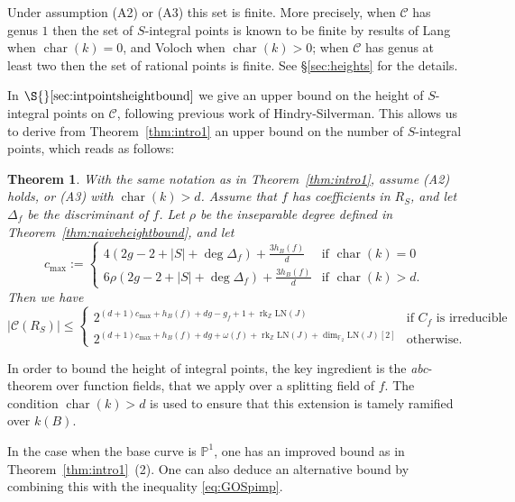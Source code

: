 \documentclass[11pt]{article}
\newcommand{\Z}{\ensuremath{\mathbb{Z}}}
\newcommand{\F}{\ensuremath{\mathbb{F}}}
\theoremstyle{plain}
\newtheorem{theorem}{Theorem}[section]
\theoremstyle{definition}
\DeclareMathOperator{\rk}{rk}
\DeclareMathOperator{\car}{char}
\newcommand{\LN}{\mathrm{LN}}
\begin{document}
Under assumption (A2) or (A3) this set is finite. More precisely, when $\mathcal{C}$ has genus $1$ then the set of $S$-integral points is known to be finite by results of Lang \cite{lang1960} when $\car(k)=0$, and Voloch \cite{voloch90} when $\car(k)>0$; when $\mathcal{C}$ has genus at least two then the set of rational points is finite. See \S{}\ref{sec:heights} for the details.

In $\S{}\ref{sec:intpointsheightbound}$ we give an upper bound on the height of $S$-integral points on $\mathcal{C}$, following previous work of Hindry-Silverman. This allows us to derive from Theorem~\ref{thm:intro1} an upper bound on the number of $S$-integral points, which reads as follows:

\begin{theorem}
\label{thm:intro2}
With the same notation as in Theorem~\ref{thm:intro1}, assume (A2) holds, or (A3) with $\car(k)>d$. Assume that $f$ has coefficients in $R_S$, and let $\Delta_f$ be the discriminant of $f$. Let $\rho$ be the inseparable degree defined in Theorem~\ref{thm:naiveheightbound}, and let
$$
c_{\max} :=
\begin{cases}
 4(2g - 2 + |S| + \deg\Delta_f) + \frac{3h_B(f)}{d} & \text{if $\car(k)=0$} \\
 6\rho(2g - 2 + |S| + \deg\Delta_f) + \frac{3h_B(f)}{d} & \text{if $\car(k)>d$.}
\end{cases}
$$
Then we have
$$
|\mathcal{C}(R_S)| \leq
\begin{cases}
2^{(d+1)c_{\max}+h_B(f) + dg - g_f +1 + \rk_\Z \LN(J)} & \text{if $C_f$ is irreducible} \\
2^{(d+1)c_{\max}+h_B(f) + dg + \omega(f) + \rk_\Z \LN(J) + \dim_{\F_2} \LN(J)[2]} & \text{otherwise.}
\end{cases}
$$
\end{theorem}

In order to bound the height of integral points, the key ingredient is the \emph{abc}-theorem over function fields, that we apply over a splitting field of $f$. The condition $\car(k)>d$ is used to ensure that this extension is tamely ramified over $k(B)$.


In the case when the base curve is $\mathbb{P}^1$, one has an improved bound as in Theorem~\ref{thm:intro1}~(2). One can also deduce an alternative bound by combining this with the inequality \eqref{eq:GOSpimp}.
\end{document}
